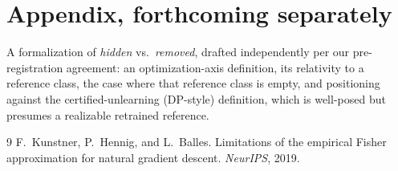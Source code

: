\documentclass[11pt]{article}
\begin{document}
\section*{Appendix, forthcoming separately}

A formalization of \emph{hidden} vs.\ \emph{removed}, drafted independently
per our pre-registration agreement: an optimization-axis definition, its
relativity to a reference class, the case where that reference class is empty,
and positioning against the certified-unlearning (DP-style) definition, which
is well-posed but presumes a realizable retrained reference.

\begin{thebibliography}{9}
F.~Kunstner, P.~Hennig, and L.~Balles.
\newblock Limitations of the empirical Fisher approximation for natural
gradient descent.
\newblock \emph{NeurIPS}, 2019.
\end{thebibliography}
\end{document}
